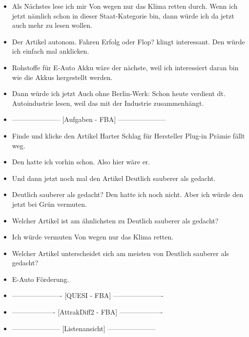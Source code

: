{\begin{itemize}[]
            \item {} Als Nächstes lese ich mir \flqq Von wegen nur das Klima retten\frqq{} durch.
                  Wenn ich jetzt nämlich schon in dieser Staat-Kategorie bin, dann würde ich da jetzt auch mehr zu lesen wollen.
            \item {} Der Artikel \flqq autonom. Fahren Erfolg oder Flop?\frqq{} klingt interessant.
                  Den würde ich einfach mal anklicken.
            \item {} \flqq Rohstoffe für E-Auto Akku\frqq{} wäre der nächste, weil ich interessiert daran bin wie die Akkus hergestellt werden.
            \item {} Dann würde ich jetzt \flqq Auch ohne Berlin-Werk: Schon heute verdient dt. Autoindustrie\frqq{} lesen, weil das mit der Industrie zusammenhängt.
            \item {---------------------} [Aufgaben - FBA] {---------------------}
            \item {} Finde und klicke den Artikel \flqq Harter Schlag für Hersteller Plug-in Prämie fällt weg\frqq{}.
            \item {} Den hatte ich vorhin schon. Also hier wäre er.
            \item {} Und dann jetzt noch mal den Artikel \flqq Deutlich sauberer als gedacht\frqq{}.
            \item {} \flqq Deutlich sauberer als gedacht\frqq{}?
                  Den hatte ich noch nicht.
                  Aber ich würde den jetzt bei Grün vermuten.
            \item {} Welcher Artikel ist am ähnlichsten zu \flqq Deutlich sauberer als gedacht\frqq{}?
            \item {} Ich würde vermuten \flqq Von wegen nur das Klima retten\frqq{}.
            \item {} Welcher Artikel unterscheidet sich am meisten von \flqq Deutlich sauberer als gedacht\frqq{}?
            \item {} \flqq E-Auto Förderung\frqq{}.
            \item {----------------------} [QUESI - FBA] {----------------------}
            \item {-------------------} [AttrakDiff2 - FBA] {-------------------}
            \item {---------------------} [Listenansicht] {---------------------}

\end{itemize}}
